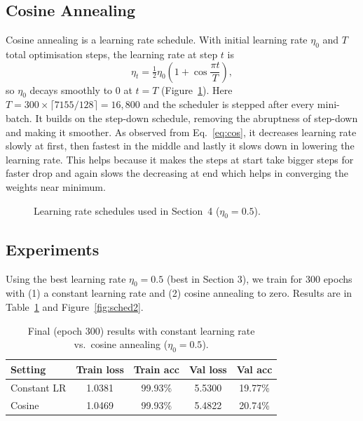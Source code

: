 \documentclass[letterpaper]{article}
\newcommand{\todo}[1]{\textcolor{red}{\textit{[#1]}}}
\begin{document}
\subsection{Cosine Annealing}
Cosine annealing \cite{loshchilov2017} is a learning rate schedule. With initial learning rate $\eta_0$ and $T$ total optimisation steps, the learning rate at step $t$ is
\begin{equation}
\eta_t=\tfrac{1}{2}\eta_0\left(1+\cos\frac{\pi t}{T}\right),
\label{eq:cos}
\end{equation}
so $\eta_0$ decays smoothly to $0$ at $t=T$ (Figure~\ref{fig:sched}). Here $T=300\times\lceil 7155/128\rceil=16{,}800$ and the scheduler is stepped after every mini-batch.
It builds on the step-down schedule, removing the abruptness of step-down and making it smoother. As observed from Eq.~\ref{eq:cos}, it decreases learning rate slowly at first, then fastest in the middle and lastly it slows down in lowering the learning rate. This helps because it makes the steps at start take bigger steps for faster drop and again slows the decreasing at end which helps in converging the weights near minimum.

\begin{figure}[ht]
\centering
{}
\caption{Learning rate schedules used in Section~4 ($\eta_0=0.5$).}
\label{fig:sched}
\end{figure}

\subsection{Experiments}
Using the best learning rate $\eta_0=0.5$ (best in Section 3), we train for 300 epochs with (1) a constant learning rate and (2) cosine annealing to zero. Results are in Table~\ref{tab:sched} and Figure~\ref{fig:sched2}.

\begin{table}[ht]
\centering
\footnotesize\setlength{\tabcolsep}{3pt}
\begin{tabular}{lcccc}
\toprule
Setting & Train loss & Train acc & Val loss & Val acc\\
\midrule
Constant LR & 1.0381 & 99.93\% & 5.5300 & 19.77\%\\
Cosine      & 1.0469 & 99.93\% & 5.4822 & 20.74\%\\
\bottomrule
\end{tabular}
\caption{Final (epoch 300) results with constant learning rate vs.\ cosine annealing ($\eta_0=0.5$).}
\label{tab:sched}
\end{table}
\end{document}
